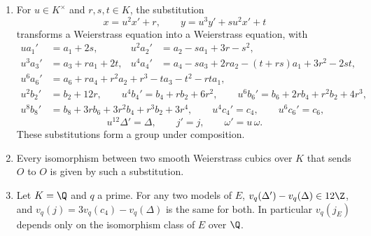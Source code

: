\begin{proposition}\label{prop:ellcurves:coordchange}
\leavevmode
\begin{enumerate}[label=(\roman*)]
\item For $u\in K^\times$ and $r,s,t\in K$, the substitution
\[
x=u^2x'+r,\qquad y=u^3y'+su^2x'+t
\]
transforms a Weierstrass equation into a Weierstrass equation, with
\begin{align*}
ua_1'&=a_1+2s, & u^2a_2'&=a_2-sa_1+3r-s^2,\\
u^3a_3'&=a_3+ra_1+2t, & u^4a_4'&=a_4-sa_3+2ra_2-(t+rs)a_1+3r^2-2st,
\end{align*}
\begin{align*}
u^6a_6'&=a_6+ra_4+r^2a_2+r^3-ta_3-t^2-rta_1,\\
u^2b_2'&=b_2+12r,\qquad u^4b_4'=b_4+rb_2+6r^2,\qquad u^6b_6'=b_6+2rb_4+r^2b_2+4r^3,\\
u^8b_8'&=b_8+3rb_6+3r^2b_4+r^3b_2+3r^4,\qquad u^4c_4'=c_4,\qquad u^6c_6'=c_6,
\end{align*}
\[
u^{12}\Delta'=\Delta,\qquad j'=j,\qquad \omega'=u\,\omega .
\]
These substitutions form a group under composition.
\item Every isomorphism between two smooth Weierstrass cubics over $K$ that sends $O$ to $O$ is given by such a substitution.
\item Let $K=\Q$ and $q$ a prime. For any two models of $E$, $v_q(\Delta')-v_q(\Delta)\in12\Z$, and $v_q(j)=3v_q(c_4)-v_q(\Delta)$ is the same for
both. In particular $v_q(j_E)$ depends only on the isomorphism class of $E$ over $\Q$.
\end{enumerate}
\end{proposition}

